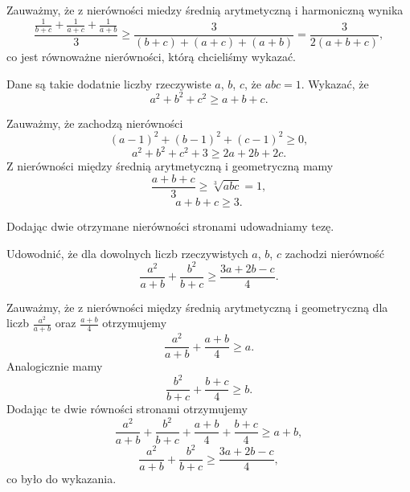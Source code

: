 \noindent
Zauważmy, że z nierówności miedzy średnią arytmetyczną i harmoniczną wynika
\[
	\frac{\frac{1}{b + c} + \frac{1}{a + c} + \frac{1}{a + b}}{3} \geqslant \frac{3}{(b + c) + (a + c) + (a + b)} = \frac{3}{2(a + b + c)},
\]
co jest równoważne nierówności, którą chcieliśmy wykazać.

\vspace{5px}

\begin{problem}{4} 
	Dane są takie dodatnie liczby rzeczywiste $a$, $b$, $c$, że $abc = 1$. Wykazać, że
	\[
		a^2 + b^2 + c^2 \geqslant a + b + c.
	\]
\end{problem}

\vspace{5px}

\noindent
Zauważmy, że zachodzą nierówności
\[
	(a - 1)^2 + (b - 1)^2 + (c - 1)^2 \geqslant 0,
\]
\[
	a^2 + b^2 + c^2 + 3 \geqslant 2a + 2b + 2c.
\]
Z nierówności między średnią arytmetyczną i geometryczną mamy
\[
	\frac{a + b + c}{3} \geqslant \sqrt[3]{abc} = 1,
\]
\[
	a + b + c \geqslant 3.
\]

\noindent
Dodając dwie otrzymane nierówności stronami udowadniamy tezę.

\vspace{5px}

\begin{problem}{5} 
	Udowodnić, że dla dowolnych liczb rzeczywistych $a$, $b$, $c$ zachodzi nierówność
	\[
		\frac{a^2}{a + b} + \frac{b^2}{b + c} \geqslant \frac{3a + 2b - c}{4}. 
	\]
\end{problem}

\vspace{5px}

\noindent
Zauważmy, że z nierówności między średnią arytmetyczną i geometryczną dla liczb $\frac{a^2}{a + b}$ oraz $\frac{a + b}{4}$ otrzymujemy
\[
	\frac{a^2}{a + b} + \frac{a + b}{4} \geqslant a.
\]
Analogicznie mamy
\[
	\frac{b^2}{b + c} + \frac{b + c}{4} \geqslant b.
\]
Dodając te dwie równości stronami otrzymujemy
\[
	\frac{a^2}{a + b} + \frac{b^2}{b + c} + \frac{a + b}{4} + \frac{b + c}{4} \geqslant a + b,
\]
\[
	\frac{a^2}{a + b} + \frac{b^2}{b + c} \geqslant \frac{3a + 2b - c}{4},
\]
co było do wykazania.
